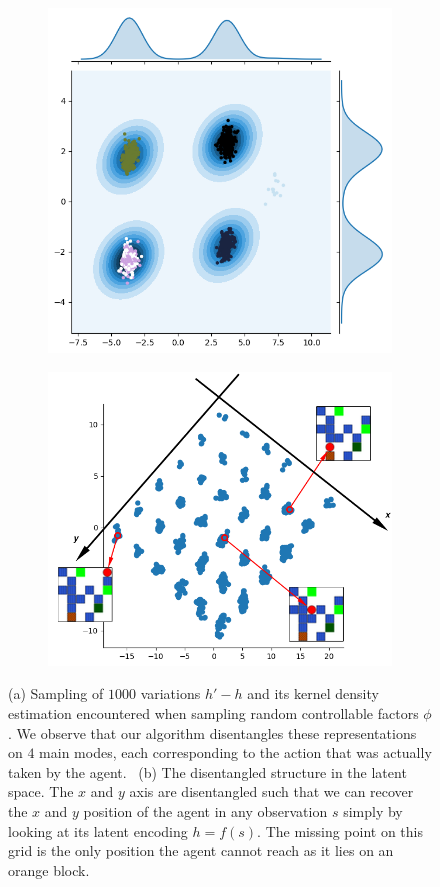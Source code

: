 \begin{figure}
\centering
\begin{subfigure}{.45\textwidth}
{\includegraphics[width=0.9\linewidth]{articles/icf/figures/23000_kde_dh.png}}
\end{subfigure}
\centering
\begin{subfigure}{.45\textwidth}
{\includegraphics[width=0.9\linewidth]{articles/icf/figures/disentangle-kdeh.png}} %
\end{subfigure}

\caption{(a) Sampling of $1000$ variations $h' - h$ and its kernel density estimation encountered when sampling random controllable factors $\phi$. We observe that our algorithm disentangles these representations on $4$ main modes, each corresponding to the action that was actually taken by the agent.\protect\footnotemark
\, (b) The disentangled structure in the latent space. The $x$ and $y$ axis are disentangled such that we can recover the $x$ and $y$ position of the agent in any observation $s$ simply by looking at its latent encoding $h = f(s)$. The missing point on this grid is the only position the agent cannot reach as it lies on an orange block.}
\label{fig:dis_space}
\end{figure}

